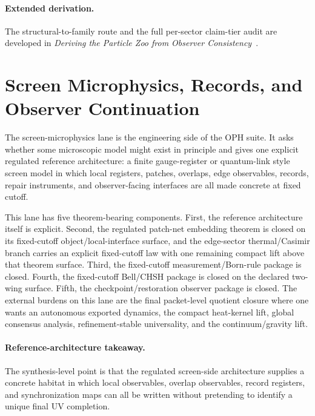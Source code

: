 \paragraph{Extended derivation.}
The structural-to-family route and the full per-sector claim-tier audit are developed in
\emph{Deriving the Particle Zoo from Observer Consistency}~\cite{ophparticles}.

\section{Screen Microphysics, Records, and Observer Continuation}

The screen-microphysics lane is the engineering side of the OPH suite. It asks
whether some microscopic model might exist in principle and gives one explicit regulated
reference architecture: a finite gauge-register or quantum-link style screen model in which local
registers, patches, overlaps, edge observables, records, repair instruments, and observer-facing
interfaces are all made concrete at fixed cutoff.

This lane has five theorem-bearing components. First, the reference architecture itself is
explicit. Second, the regulated patch-net embedding theorem is closed on its fixed-cutoff
object/local-interface surface, and the edge-sector thermal/Casimir branch carries an explicit
fixed-cutoff law with one remaining compact lift above that theorem surface.
Third, the fixed-cutoff measurement/Born-rule package is closed. Fourth, the fixed-cutoff
Bell/CHSH package is closed on the declared two-wing surface. Fifth, the
checkpoint/restoration observer package is closed. The external burdens on this lane are the final
packet-level quotient closure where one wants an autonomous exported dynamics, the compact
heat-kernel lift, global consensus analysis, refinement-stable universality, and the
continuum/gravity lift.

\paragraph{Reference-architecture takeaway.}
The synthesis-level point is that the regulated screen-side architecture supplies a concrete
habitat in which local observables, overlap observables, record registers, and synchronization
maps can all be written without pretending to identify a unique final UV completion.


